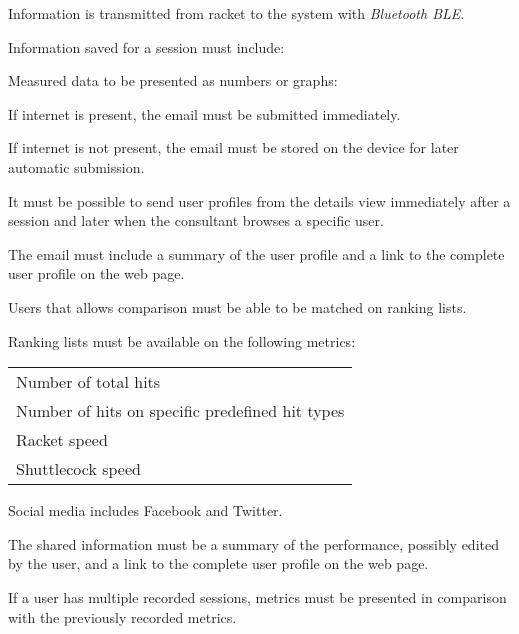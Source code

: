 Information is transmitted from racket to the system with \textit{Bluetooth BLE}. 

Information saved for a session must include: \newline
{}


Measured data to be presented as numbers or graphs: \newline
{}


If internet is present, the email must be submitted immediately.

If internet is not present, the email must be stored on the device for later automatic submission.

It must be possible to send user profiles from the details view immediately after a session and later when the consultant browses a specific user.

The email must include a summary of the user profile and a link to the complete user profile on the web page.


Users that allows comparison must be able to be matched on ranking lists.

Ranking lists must be available on the following metrics: \newline
\begin{tabularx}{\textwidth}{X}
    Number of total hits \\
    Number of hits on specific predefined hit types \\
    Racket speed \\
    Shuttlecock speed \\
\end{tabularx}


Social media includes Facebook and Twitter.

The shared information must be a summary of the performance, possibly edited by the user, and a link to the complete user profile on the web page.


If a user has multiple recorded sessions, metrics must be presented in comparison with the previously recorded metrics.
